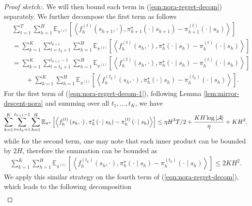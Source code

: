 \begin{proof}[Proof sketch:]
 We will then bound each term in (\ref{eqn:nora-regret-decom}) separately. We further decompose the first term as follows
 \begin{align}\label{eqn:nora-regret-decom-1}
           &\sum_{t=1}^T \sum_{h=1}^H \mathbb{E}_{\pi^{(t)}}\left[\left\langle f_h^{(t)}\left(s_{h+1}, \cdot\right), \pi_{h+1}^{\star}\left(\cdot \mid s_{h+1}\right)-\pi_{h+1}^{(t)}\left(\cdot \mid s_h\right)\right\rangle\right] \nonumber\\
        &= \sum_{k=1}^{K} \sum_{t=t_{k}+1}^{t_{k+1}} \sum_{h=1}^H \mathbb{E}_{\pi^{(t)}}\left[\left\langle f_h^{(t)}\left(s_h, \cdot\right), \pi_h^{\star}\left(\cdot \mid s_h\right)-\pi_h^{(t)}\left(\cdot \mid s_h\right)\right\rangle\right] \nonumber\\
        &= \sum_{k=1}^{K} \sum_{t=t_{k}+1}^{t_{k+1}-1} \sum_{h=1}^H \mathbb{E}_{\pi^{(t)}}\left[\left\langle f_h^{(t)}\left(s_h, \cdot\right), \pi_h^{\star}\left(\cdot \mid s_h\right)-\pi_h^{(t)}\left(\cdot \mid s_h\right)\right\rangle\right] \nonumber\\
        &\qquad+ \sum_{k=1}^{K}\sum_{h=1}^H \mathbb{E}_{\pi^{(t)}}\left[\left\langle f_h^{(t_k)}\left(s_h, \cdot\right), \pi_h^{\star}\left(\cdot \mid s_h\right)-\pi_h^{(t_k)}\left(\cdot \mid s_h\right)\right\rangle\right].
 \end{align}
For the first term of (\ref{eqn:nora-regret-decom-1}), following Lemma \ref{lem:mirror-descent-nora} and summing over all $t_1,\ldots,t_K$, we have
\begin{align}\label{eqn:nora-regret-decom-11}
    \sum_{k=1}^{K}\sum_{t=t_k+1}^{t_{k+1}-1} \sum_{h=1}^H \mathbb{E}_{\pi^*}\left[\left\langle f_h^{(t)}\left(s_h, \cdot\right), \pi_h^*\left(\cdot \mid s_h\right)-\pi_h^{(t)}\left(\cdot \mid s_h\right)\right\rangle\right] \leq \eta H^3 T/2 + \frac{KH \log |{\mathcal{A}}|}{\eta} + KH^2,
\end{align}
 while for the second term, one may note that each inner product can be bounded by $2H$, therefore the summation can be bounded as
 \begin{align}\label{eqn:nora-regret-decom-12}
   \sum_{k=1}^{K}\sum_{h=1}^H \mathbb{E}_{\pi^{(t)}}\left[\left\langle f_h^{(t_k)}\left(s_h, \cdot\right), \pi_h^{\star}\left(\cdot \mid s_h\right)-\pi_h^{(t_k)}\left(\cdot \mid s_h\right)\right\rangle\right]\leq 2KH^2.
 \end{align}
 We apply this similar strategy on the fourth term of (\ref{eqn:nora-regret-decom}), which leads to the following decomposition
 \begin{align}\label{eqn:nora-regret-decom-4}

\end{align}
\end{proof}
